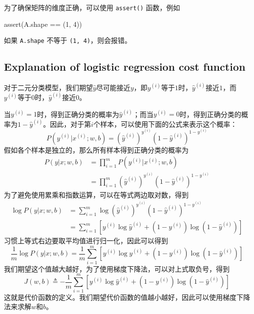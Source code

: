为了确保矩阵的维度正确，可以使用 \verb|assert()| 函数，例如
\begin{python}
assert(A.shape == (1, 4))
\end{python}
如果 \verb|A.shape| 不等于 \verb|(1, 4)|，则会报错。

\subsection{Explanation of logistic regression cost function}

对于二元分类模型，我们期望$\hat{y}$尽可能接近$y$，即${y}^{(i)}$等于$1$时，$\hat{y}^{(i)}$接近$1$，而${y}^{(i)}$等于$0$时，$\hat{y}^{(i)}$接近$0$。

当$y^{(i)}=1$时，得到正确分类的概率为$\hat{y}^{(i)}$；而当$y^{(i)}=0$时，得到正确分类的概率为$1-\hat{y}^{(i)}$。因此，对于第$i$个样本，可以使用下面的公式来表示这个概率：
\begin{equation}
    P(y^{(i)} | x^{(i)}; w, b) = (\hat{y}^{(i)})^{y^{(i)}} (1-\hat{y}^{(i)})^{1-y^{(i)}}
\end{equation}
假如各个样本是独立的，那么所有样本得到正确分类的概率为
\begin{equation}
    \begin{aligned}
        P(y | x; w, b) &= \prod_{i=1}^{m} P(y^{(i)} | x^{(i)}; w, b)\\
        &= \prod_{i=1}^{m} (\hat{y}^{(i)})^{y^{(i)}} (1-\hat{y}^{(i)})^{1-y^{(i)}}
    \end{aligned}
\end{equation}
为了避免使用累乘和指数运算，可以在等式两边取对数，得到
\begin{equation}
    \begin{aligned}
        \log P(y | x; w, b) &= \sum_{i=1}^{m} \log (\hat{y}^{(i)})^{y^{(i)}} (1-\hat{y}^{(i)})^{1-y^{(i)}}\\
        &= \sum_{i=1}^{m} \left[ y^{(i)} \log \hat{y}^{(i)} + (1-y^{(i)}) \log (1-\hat{y}^{(i)}) \right]
    \end{aligned}
\end{equation}
习惯上等式右边要取平均值进行归一化，因此可以得到
\begin{equation}
    \frac{1}{m} \log P(y | x; w, b) = \frac{1}{m} \sum_{i=1}^{m} \left[ y^{(i)} \log \hat{y}^{(i)} + (1-y^{(i)}) \log (1-\hat{y}^{(i)}) \right]
\end{equation}
我们期望这个值越大越好，为了使用梯度下降法，可以对上式取负号，得到
\begin{equation}
    J(w, b) \triangleq - \frac{1}{m} \sum_{i=1}^{m} \left[ y^{(i)} \log \hat{y}^{(i)} + (1-y^{(i)}) \log (1-\hat{y}^{(i)}) \right]
\end{equation}
这就是代价函数的定义。我们期望代价函数的值越小越好，因此可以使用梯度下降法来求解$w$和$b$。

